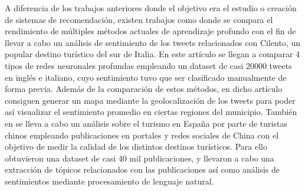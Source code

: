 A diferencia de los trabajos anteriores donde el objetivo era el estudio o creación de sistemas de recomendación, existen trabajos como \cite{tourism_dest_rec_geolocation} donde se compara el rendimiento de múltiples métodos actuales de aprendizaje profundo con el fin de llevar a cabo un análisis de sentimiento de los tweets relacionados con Cilento, un popular destino turístico del sur de Italia. En este artículo se llegan a comparar 4 tipos de redes neuronales profundas empleando un dataset de casi 20000 tweets en inglés e italiano, cuyo sentimiento tuvo que ser clasificado manualmente de forma previa. Además de la comparación de estos métodos, en dicho artículo consiguen generar un mapa mediante la geolocalización de los tweets para poder así visualizar el sentimiento promedio en ciertas regiones del municipio. También en \cite{su13116015} se lleva a cabo un análisis sobre el turismo en España por parte de turistas chinos empleando publicaciones en portales y redes sociales de China con el objetivo de medir la calidad de los distintos destinos turísticos. Para ello obtuvieron una dataset de casi 40 mil publicaciones, y llevaron a cabo una extracción de tópicos relacionados con las publicaciones así como análisis de sentimientos mediante procesamiento de lenguaje natural.\\